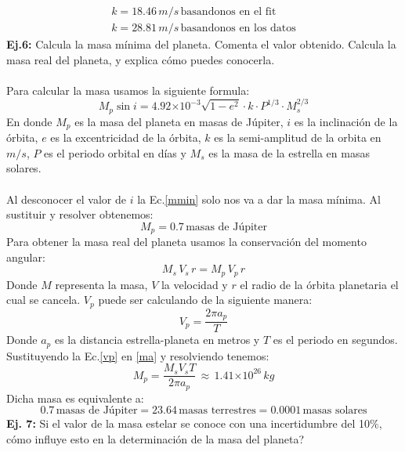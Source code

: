 \documentclass[12pt,letterpaper]{article}
\newcommand\tenpow[1]{\ensuremath{{\times}10^{#1}}}
\begin{document}
\begin{gather}
k=18.46\,m/s\,\text{basandonos en el fit}\\
k=28.81\,m/s\,\text{basandonos en los datos}
\end{gather}
\textbf{Ej.6:}  Calcula la masa mínima del planeta. Comenta el valor obtenido. Calcula la masa real del planeta, y explica cómo puedes conocerla.\\\\
Para calcular la masa usamos la siguiente formula:
\begin{equation}
M_p\sin{i}=4.92\tenpow{-3}\sqrt{1-e^2}{\cdot}k{\cdot}P^{1/3}{\cdot}M^{2/3}_s
\label{mmin}
\end{equation}
En donde $M_p$ es la masa del planeta en masas de Júpiter, $i$ es la inclinación de la órbita, $e$ es la excentricidad de la órbita, $k$ es la semi-amplitud de la orbita en $m/s$, $P$ es el periodo orbital en días y $M_s$ es la masa de la estrella en masas solares.\\\\
Al desconocer el valor de $i$ la Ec.\ref{mmin} solo nos va a dar la masa mínima. Al sustituir y resolver obtenemos:
\begin{equation}
M_p=0.7\,\text{masas de Júpiter}
\end{equation}
Para obtener la masa real del planeta usamos la conservación del momento angular:
\begin{equation}
M_s\,V_s\,r=M_p\,V_p\,r
\label{ma}
\end{equation}
Donde $M$ representa la masa, $V$ la velocidad y $r$ el radio de la órbita planetaria el cual se cancela. $V_p$ puede ser calculando de la siguiente manera:
\begin{equation}
V_p=\frac{2{\pi}a_p}{T}
\label{vp}
\end{equation}
Donde $a_p$ es la distancia estrella-planeta en metros y $T$ es el periodo en segundos. Sustituyendo la Ec.\ref{vp} en \ref{ma} y resolviendo tenemos:
\begin{equation}
M_p=\frac{M_sV_sT}{2{\pi}a_p}\,\approx\,1.41\tenpow{26}\,kg
\end{equation}
Dicha masa es equivalente a:
\begin{equation}
0.7\,\text{masas de Júpiter}=23.64\,\text{masas terrestres}=0.0001\,\text{masas solares}
\end{equation}
\textbf{Ej. 7:} Si el valor de la masa estelar se conoce con una incertidumbre del 10$\%$, cómo influye esto en la determinación de la masa del planeta?\\\\
\end{document}
